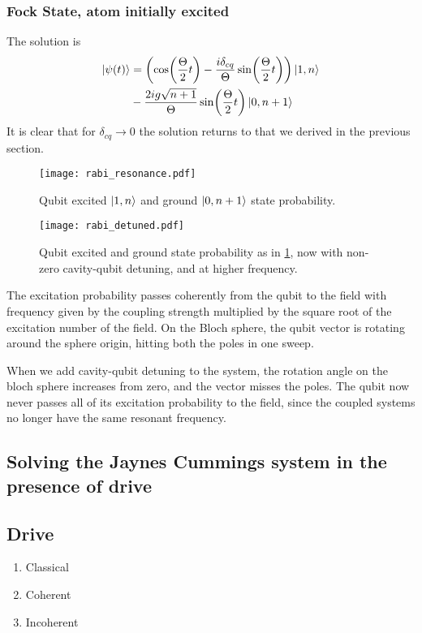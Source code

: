 \subsubsection{Fock State, atom initially excited}
The solution is 
\begin{align*}
  \ket{\psi(t)} &= \left(\cos(\frac{\Theta}{2}t)-\frac{i\delta_{cq}}{\Theta}\sin(\frac{\Theta}{2}t) \right)\ket{1, n} \\
                &-\frac{2ig\sqrt{n+1}}{\Theta}\sin(\frac{\Theta}{2}t)\ket{0, n+1}
\end{align*}
It is clear that for $\delta_{cq} \rightarrow 0$ the solution returns to that we derived in the previous section. 
\begin{figure}[h]
  \texttt{[image: rabi\_resonance.pdf]}
  \caption{Qubit excited $\ket{1, n}$ and ground $\ket{0, n+1}$ state probability.}
  \label{rabi_resonance}
\end{figure}
\begin{figure}[h]
  \texttt{[image: rabi\_detuned.pdf]}
  \caption{Qubit excited and ground state probability as in \cref{rabi_resonance}, now with non-zero cavity-qubit detuning, and at higher frequency.}
  \label{rabi_detuning}
\end{figure}
The excitation probability passes coherently from the qubit to the field with frequency given by the coupling strength multiplied by the square root of the excitation number of the field.
On the Bloch sphere, the qubit vector is rotating around the sphere origin, hitting both the poles in one sweep. 

When we add cavity-qubit detuning to the system, the rotation angle on the bloch sphere increases from zero, and the vector misses the poles. 
The qubit now never passes all of its excitation probability to the field, since the coupled systems no longer have the same resonant frequency. 
\subsection{Solving the Jaynes Cummings system in the presence of drive}
\subsection{Drive}
\begin{enumerate}
  \item Classical
  \item Coherent
  \item Incoherent
\end{enumerate}
